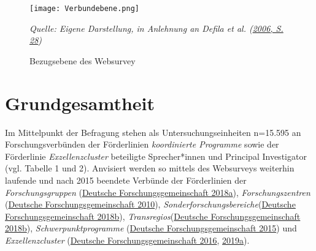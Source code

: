 \documentclass[a4paper,10pt,twoside]{article}
\begin{document}
\newcommand{\source}[1]{\caption*{Source: {#1}} }

\begin{figure}[h]
\caption{Bezugsebene des Websurvey}
  \centering
     \texttt{[image: Verbundebene.png]}\linebreak

  \begin{footnotesize}
  \textit{Quelle: Eigene Darstellung, in Anlehnung an Defila et al. (\protect\hyperlink{ref-defilaForschungsverbundmanagementHandbuchFur2006}{2006, S. 28})}
  \end{footnotesize}
  \label{fig:Schimank}
\end{figure}

\hypertarget{grundgesamtheit}{%
\section{Grundgesamtheit}\label{grundgesamtheit}}

Im Mittelpunkt der Befragung stehen als Untersuchungseinheiten n=15.595 an Forschungsverbünden der Förderlinien \emph{koordinierte Programme} sowie der Förderlinie \emph{Exzellenzcluster} beteiligte Sprecher*innen und Principal Investigator (vgl. Tabelle 1 und 2). Anvisiert werden so mittels des Websurveys weiterhin laufende und nach 2015 beendete Verbünde der Förderlinien der \emph{Forschungsgruppen} (\protect\hyperlink{ref-deutscheforschungsgemeinschaftMerkblattForschungsgruppenDFGVordruck2018a}{Deutsche Forschungsgemeinschaft 2018a}),
\emph{Forschungszentren} (\protect\hyperlink{ref-deutscheforschungsgemeinschaftMerkblattForschungszentrenDFGVordruck2010}{Deutsche Forschungsgemeinschaft 2010}),
\emph{Sonderforschungsbereiche}(\protect\hyperlink{ref-deutscheforschungsgemeinschaftMerkblattSonderforschungsbereicheDFGVordruck2018}{Deutsche Forschungsgemeinschaft 2018b}), \emph{Transregios}(\protect\hyperlink{ref-deutscheforschungsgemeinschaftMerkblattSonderforschungsbereicheDFGVordruck2018}{Deutsche Forschungsgemeinschaft 2018b}), \emph{Schwerpunktprogramme} (\protect\hyperlink{ref-deutscheforschungsgemeinschaftMerkblattSchwerpunktprogrammDFGVordruck2015}{Deutsche Forschungsgemeinschaft 2015}) und
\emph{Exzellenzcluster} (\protect\hyperlink{ref-deutscheforschungsgemeinschaftExzellenzcluster200520172016}{Deutsche Forschungsgemeinschaft 2016}, \protect\hyperlink{ref-deutscheforschungsgemeinschaftForderlinieExzellenzclusterExzellenzstrategieMerkblatt2019}{2019a}).
\end{document}
